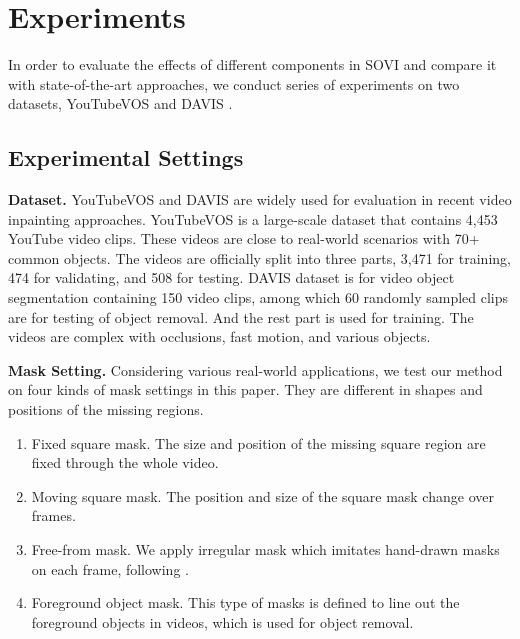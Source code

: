 


\section{Experiments}

In order to evaluate the effects of different components in SOVI and compare it with state-of-the-art approaches, we conduct series of experiments on two datasets, YouTubeVOS \cite{xu2018Youtube} and DAVIS \cite{davis_2017}.
\subsection{Experimental Settings}
\textbf{Dataset.} 
YouTubeVOS and DAVIS are widely used for evaluation in recent video inpainting approaches.
YouTubeVOS is a large-scale dataset that contains 4,453 YouTube video clips. These videos are close to real-world scenarios
 with 70+ common objects. 
The videos are officially split into three parts, 3,471 for training, 474 for validating, and 508 for testing. 
DAVIS dataset is for video object segmentation containing 150 video clips, among which 60 randomly sampled clips are for testing of object removal. And the rest part is used for training.
The videos are complex with occlusions, fast motion, and various objects. 

\noindent \textbf{Mask Setting.} Considering various real-world applications, we test our method on four kinds of mask settings in this paper. 
They are different in shapes and positions of the missing regions.
\begin{enumerate}
	\item Fixed square mask. The size and position of the missing square region are fixed through the whole video. 
	\item Moving square mask. The position and size of the square mask change over frames. 
	\item Free-from mask. We apply irregular mask which imitates hand-drawn masks on each frame, following \cite{liu2018partialinpainting}. 
	\item Foreground object mask. This type of masks is defined to line out the foreground objects in videos, which is used for object removal.
\end{enumerate}


